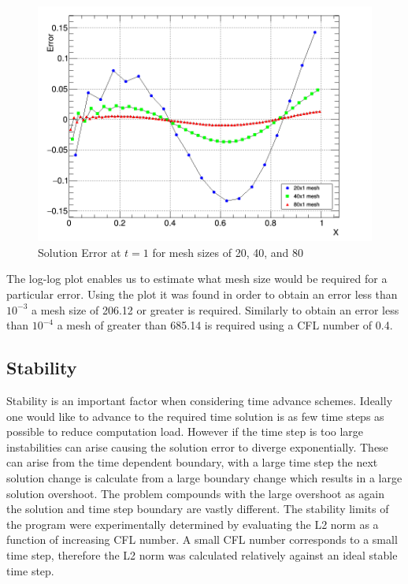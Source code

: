 \documentclass[paper=a4, fontsize=11pt, abstract=on]{scrartcl}
\numberwithin{equation}{section}		%
\numberwithin{figure}{section}			%
\numberwithin{table}{section}				%
\begin{document}
\begin{figure}[H]
\centering
\includegraphics[width=0.85\linewidth]{qq22}
\caption{Solution Error at $t=1$ for mesh sizes of 20, 40, and 80}
\label{3D}
\end{figure}


The log-log plot enables us to estimate what mesh size would be required for a particular error. Using the plot it was found in order to obtain an error less than $10^{-3}$ a mesh size of 206.12 or greater is required. Similarly to obtain an error less than $10^{-4}$ a mesh of greater than 685.14 is required using a CFL number of 0.4.

\subsection{Stability}
Stability is an important factor when considering time advance schemes. Ideally one would like to advance to the required time solution is as few time steps as possible to reduce computation load. However if the time step is too large instabilities can arise causing the solution error to diverge exponentially. These can arise from the time dependent boundary, with a large time step the next solution change is calculate from a large boundary change which results in a large solution overshoot. The problem  compounds with the large overshoot as again the solution and time step boundary are vastly different. The stability limits of the program were experimentally determined by evaluating the L2 norm as a function of increasing CFL number. A small CFL number corresponds to a small time step, therefore the L2 norm was calculated relatively against an ideal stable time step. 
\end{document}
